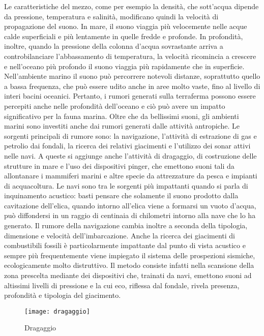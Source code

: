 Le caratteristiche del mezzo, come per esempio la densità, che sott’acqua dipende da pressione, temperatura e salinità, modificano quindi la velocità di propagazione del suono.
In mare, il suono viaggia più velocemente nelle acque calde superficiali e più lentamente in quelle fredde e profonde. 
In profondità, inoltre, quando la pressione della colonna d’acqua sovrastante arriva a controbilanciare l’abbassamento di temperatura, la velocità ricomincia a crescere e nell’oceano più profondo il suono viaggia più rapidamente che in superficie. 
Nell’ambiente marino il suono può percorrere notevoli distanze, soprattutto quello a bassa frequenza, che può essere udito anche in aree molto vaste, fino al livello di interi bacini oceanici. Pertanto, i rumori generati sulla terraferma possono essere percepiti anche nelle profondità dell’oceano e ciò può avere un impatto significativo per la fauna marina.
Oltre che da bellissimi suoni, gli ambienti marini sono investiti anche dai rumori generati dalle attività antropiche. 
Le sorgenti principali di rumore sono: la navigazione, l’attività di estrazione di gas e petrolio dai fondali, la ricerca dei relativi giacimenti e l’utilizzo dei sonar attivi nelle navi. 
A queste si aggiunge anche l’attività di dragaggio, di costruzione delle strutture in mare e l’uso dei dispositivi pinger, che emettono suoni tali da allontanare i mammiferi marini e altre specie da attrezzature da pesca e impianti di acquacoltura.
Le navi sono tra le sorgenti più impattanti quando si parla di inquinamento acustico:  basti pensare che solamente il suono prodotto dalla cavitazione dell’elica, quando intorno all’elica viene a formarsi un vuoto d’acqua, può diffondersi in un raggio di centinaia di chilometri intorno alla nave che lo ha generato. 
Il rumore della navigazione cambia inoltre a seconda della tipologia, dimensione e velocità dell’imbarcazione.
Anche la ricerca dei giacimenti di combustibili fossili è particolarmente impattante dal punto di vista acustico e sempre più frequentemente viene impiegato il sistema delle prospezioni sismiche, ecologicamente molto distruttivo. 
Il metodo consiste infatti nella scansione della zona prescelta mediante dei dispositivi che, trainati da navi, emettono suoni ad altissimi livelli di pressione e la cui eco, riflessa dal fondale, rivela presenza, profondità e tipologia del giacimento.

\begin{figure}[h]
\centering
\texttt{[image: dragaggio]}
\caption{Dragaggio}
\end{figure} 

